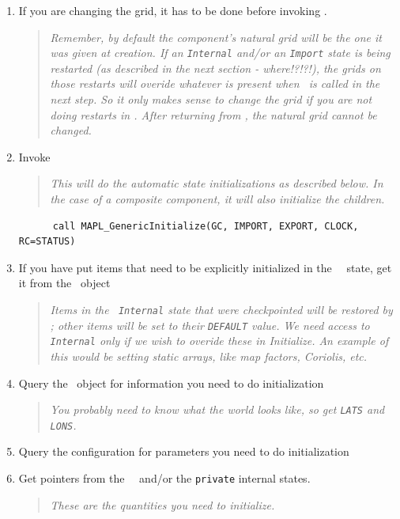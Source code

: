 \begin{enumerate}
\item If you are changing the grid, it has to be done before invoking
  \gint.
  \begin{quote} {\em Remember, by default the component's natural grid
      will be the one it was given at creation. If an {\tt Internal}
      and/or an {\tt Import} state is being restarted (as described in the
      next section - where!?!?!), the grids on those restarts will overide
      whatever is
      present when \gint\  is called in the next step. So it only makes
      sense to change the grid if you are {\em not} doing restarts in
      \gint. After returning from \gint, the natural grid cannot be changed.}
  \end{quote}
  
\item Invoke \gint
  \begin{quote} {\em This will do the automatic state initializations as
      described below. In the case of a composite component, it will also
      initialize the children.}
  \end{quote}
\begin{verbatim}
      call MAPL_GenericInitialize(GC, IMPORT, EXPORT, CLOCK,  RC=STATUS)
\end{verbatim}
  
\item If you have put items that need to be explicitly initialized in
  the \ggn\  \gin\ state, get it from the \ggn\  object
  \begin{quote} {\em Items in the  \ggn\  {\tt Internal} state that were
      checkpointed will be restored by \gint; other items will be set to
      their {\tt DEFAULT} value. We need access to {\tt Internal} only if
      we wish to overide these in Initialize. An example of this would be
      setting static arrays, like map factors, Coriolis, etc.}
  \end{quote}
  
\item Query the \ggn\  object for information you need to do initialization
  \begin{quote} {\em You probably need to know what the world looks
      like, so get {\tt LATS} and {\tt LONS}.} \end{quote}
  
\item Query the configuration for parameters you need to do initialization
  
\item Get pointers from the \ggn\  \gin\ and/or the \texttt{private} internal
  states. 
  \begin{quote}
    {\em These are the quantities you need to initialize.} 
  \end{quote}
  

\end{enumerate}
